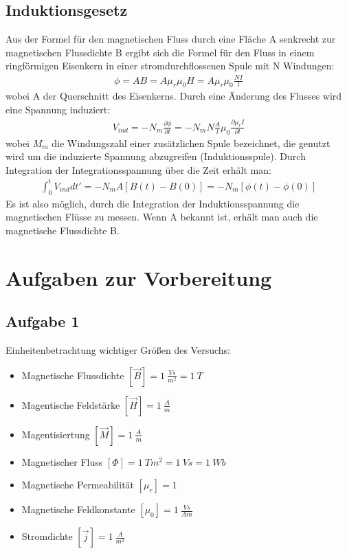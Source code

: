 \documentclass[a4paper,10pt]{scrartcl}
\begin{document}
		\newpage
		
	\subsection{Induktionsgesetz}
	
		Aus der Formel für den magnetischen Fluss durch eine Fläche A senkrecht zur magnetischen Flussdichte B ergibt sich die Formel für den Fluss in einem ringförmigen Eisenkern in einer stromdurchflossenen Spule mit N Windungen:
		\begin{align}
		\phi=AB=A\mu_{r}\mu_{0}H=A\mu_{r}\mu_{0}\frac{NI}{l}
		\end{align}
		wobei A der Querschnitt des Eisenkerns. Durch eine Änderung des Flusses wird eine Spannung induziert:
		\begin{align}
		V_{ind}=-N_{m}\frac{\partial \phi}{\partial t}=-N_{m}N\frac{A}{l}\mu_{0}\frac{\partial \mu_{r}I}{\partial t}
		\end{align}
		wobei \(M_{m}\) die Windungszahl einer zusätzlichen Spule bezeichnet, die genutzt wird um die induzierte Spannung abzugreifen (Induktionsspule). Durch Integration der Integrationsspannung über die Zeit erhält man:
		\begin{align}
		\int_{0}^{t}V_{ind}dt'=-N_{m}A[B(t)-B(0)]=-N_{m}[\phi(t)-\phi(0)]
		\end{align}
		Es ist also möglich, durch die Integration der Induktionsspannung die magnetischen Flüsse zu messen. Wenn A bekannt ist, erhält man auch die magnetische Flussdichte B.
	
	

\section{Aufgaben zur Vorbereitung}

\subsection{Aufgabe 1}
Einheitenbetrachtung wichtiger Größen des Versuchs:
\begin{itemize}
	\item Magnetische Flussdichte $[\vec{B}]=1~\frac{Vs}{m^2}=1~T$
	\item Magentische Feldstärke $[\vec{H}]=1~\frac{A}{m}$
	\item Magentisiertung $[\vec{M}]=1~\frac{A}{m}$
	\item Magnetischer Fluss $[\Phi]=1~Tm^2=1~Vs=1~Wb$
	\item Magnetische Permeabilität $[\mu_r]=1$
	\item Magnetische Feldkonstante $[\mu_0]=1~\frac{Vs}{Am}$ 
	\item Stromdichte $[\vec{j}]=1~\frac{A}{m^2}$
\end{itemize} 
\end{document}
